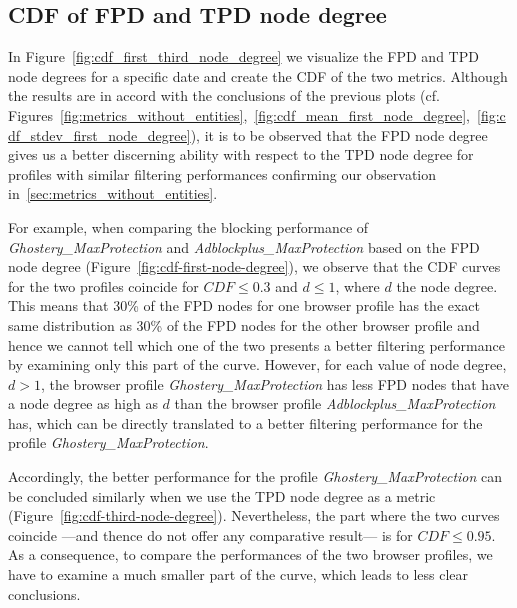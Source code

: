 \subsection{CDF of FPD and TPD node degree}
In Figure~\ref{fig:cdf_first_third_node_degree} we visualize the FPD and TPD node degrees for a specific date and create the CDF of the two metrics. Although the results are in accord with the conclusions of the previous plots (cf. Figures~\ref{fig:metrics_without_entities},~\ref{fig:cdf_mean_first_node_degree},~\ref{fig:cdf_stdev_first_node_degree}), it is to be observed that the FPD node degree gives us a better discerning ability with respect to the TPD node degree for profiles with similar filtering performances confirming our observation in~\ref{sec:metrics_without_entities}.

For example, when comparing the blocking performance of \textit{Ghostery\_\allowbreak MaxProtection} and \textit{Adblockplus\_\allowbreak MaxProtection} based on the FPD node degree (Figure~\ref{fig:cdf-first-node-degree}), we observe that  the CDF curves for the two profiles coincide for $CDF \le 0.3$ and $d \le 1$, where $d$ the node degree. This means that 30\% of the FPD nodes for one browser profile has the exact same distribution as 30\% of the FPD nodes for the other browser profile and hence we cannot tell which one of the two presents a better filtering performance by examining only this part of the curve. However, for each value of node degree, $d > 1$, the browser profile \textit{Ghostery\_\allowbreak MaxProtection} has less FPD nodes that have a node degree as high as $d$ than the browser profile \textit{Adblockplus\_\allowbreak MaxProtection} has, which can be directly translated to a better filtering performance for the profile \textit{Ghostery\_\allowbreak MaxProtection}.

Accordingly, the better performance for the profile \textit{Ghostery\_\allowbreak MaxProtection} can be concluded similarly when we use the TPD node degree as a metric (Figure~\ref{fig:cdf-third-node-degree}). Nevertheless, the part where the two curves coincide ---and thence do not offer any comparative result--- is for $CDF \le 0.95$. As a consequence, to compare the performances of the two browser profiles, we have to examine a much smaller part of the curve, which leads to less clear conclusions.


